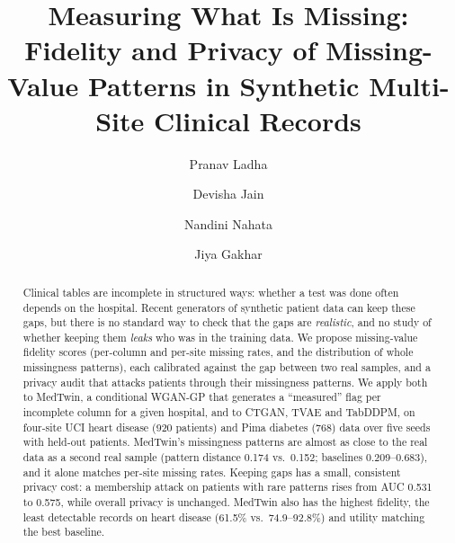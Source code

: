 \documentclass[runningheads]{llncs}
\begin{document}
\title{Measuring What Is Missing: Fidelity and Privacy of Missing-Value Patterns in Synthetic Multi-Site Clinical Records}

\author{Pranav Ladha \and Devisha Jain \and Nandini Nahata \and Jiya Gakhar}

\maketitle

\begin{abstract}
Clinical tables are incomplete in structured ways: whether a test was done
often depends on the hospital. Recent generators of synthetic patient data
can keep these gaps, but there is no standard way to check that the gaps
are \emph{realistic}, and no study of whether keeping them \emph{leaks} who
was in the training data. We propose missing-value fidelity scores
(per-column and per-site missing rates, and the distribution of whole
missingness patterns), each calibrated against the gap between two real
samples, and a privacy audit that attacks patients through their
missingness patterns. We apply both to MedTwin, a conditional WGAN-GP that
generates a ``measured'' flag per incomplete column for a given hospital,
and to CTGAN, TVAE and TabDDPM, on four-site UCI heart disease (920
patients) and Pima diabetes (768) data over five seeds with held-out
patients. MedTwin's missingness patterns are almost as close to the real
data as a second real sample (pattern distance 0.174 vs.\ 0.152;
baselines 0.209--0.683), and it alone matches per-site missing rates.
Keeping gaps has a small, consistent privacy cost: a membership attack on
patients with rare patterns rises from AUC 0.531 to 0.575, while overall
privacy is unchanged. MedTwin also has the highest fidelity, the least
detectable records on heart disease (61.5\% vs.\ 74.9--92.8\%) and utility
matching the best baseline.
\end{abstract}
\end{document}
